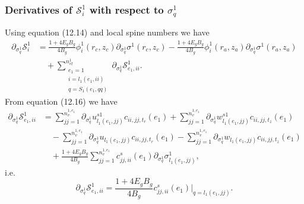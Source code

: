 \documentclass{article}
\begin{document}
\subsubsection{Derivatives of $\mathcal{S}_i^1$ with respect to $\sigma_q^1$} %
Using equation (12.14) and local spine numbers we have
\begin{align}
\partial_{\sigma_q^1} \mathcal{S}_i^1 &= \frac{1 + 4 E_g B_g}{4 B_g} \phi_i^1(r_c,z_c) \partial_{\sigma_q^1} \sigma^1(r_c,z_c) - \frac{1 + 4 E_g B_g}{4 B_g} \phi_i^1(r_a,z_a) \partial_{\sigma_q^1} \sigma^1(r_a,z_a) \nonumber\\
&\quad + \sum_{\substack{e_1=1\\ i=l_1(e_1,ii)\\ q=S_1(e_1,qq)}}^{n_{el}^1} \partial_{\sigma_q^1} \mathcal{S}_{e_1,ii}^1. \tag{12.31}
\end{align}
From equation (12.16) we have
\begin{align}
\partial_{\sigma_q^1} \mathcal{S}_{e_1,ii}^1 &= \sum_{jj=1}^{n_v^{1,e_1}} \partial_{\sigma_q^1} u_{l_1(e_1,jj)}^{s1} c_{ii,jj,t_r}(e_1) + \sum_{jj=1}^{n_v^{1,e_1}} \partial_{\sigma_q^1} w_{l_1(e_1,jj)}^{s1} c_{ii,jj,t_z}(e_1) \nonumber\\
&\quad - \sum_{jj=1}^{n_v^{1,e_1}} \partial_{\sigma_q^1} u_{l_1(e_1,jj)} c_{ii,jj,t_r}(e_1) - \sum_{jj=1}^{n_v^{1,e_1}} \partial_{\sigma_q^1} w_{l_1(e_1,jj)} c_{ii,jj,t_z}(e_1) \nonumber\\
&\quad + \frac{1 + 4 E_g B_g}{4 B_g} \sum_{jj=1}^{n_v^{1,e_1}} c_{jj,ii}^s(e_1) \partial_{\sigma_q^1} \sigma_{l_1(e_1,jj)}^1, \tag{12.32}
\end{align}
i.e.
\begin{equation}
\partial_{\sigma_q^1} \mathcal{S}_{e_1,ii}^1 = \frac{1 + 4 E_g B_g}{4 B_g} c_{jj,ii}^s(e_1) \big|_{q=l_1(e_1,jj)}. \tag{12.33}
\end{equation}
\end{document}
